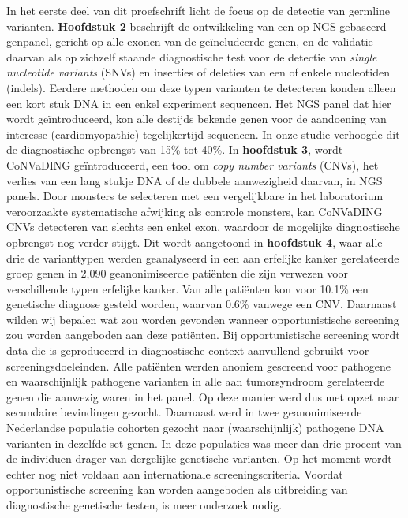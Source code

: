 \begin{appendices}
	In het eerste deel van dit proefschrift licht de focus op de detectie van germline varianten. \textbf{Hoofdstuk 2} beschrijft de ontwikkeling van een op NGS gebaseerd genpanel, gericht op alle exonen van de geïncludeerde genen, en de validatie daarvan als op zichzelf staande diagnostische test voor de detectie van \textsl{single nucleotide variants} (SNVs) en inserties of deleties van een of enkele nucleotiden (indels). Eerdere methoden om deze typen varianten te detecteren konden alleen een kort stuk DNA in een enkel experiment sequencen. Het NGS panel dat hier wordt geïntroduceerd, kon alle destijds bekende genen voor de aandoening van interesse (cardiomyopathie) tegelijkertijd sequencen. In onze studie verhoogde dit  de diagnostische opbrengst van 15\% tot 40\%. In \textbf{hoofdstuk 3}, wordt CoNVaDING geïntroduceerd, een tool om \textsl{copy number variants} (CNVs), het verlies van een lang stukje DNA of de dubbele aanwezigheid daarvan, in NGS panels. Door monsters te selecteren met een vergelijkbare in het laboratorium veroorzaakte systematische afwijking als controle monsters, kan CoNVaDING CNVs detecteren van slechts een enkel exon, waardoor de mogelijke diagnostische opbrengst nog verder stijgt. Dit wordt aangetoond in \textbf{hoofdstuk 4}, waar alle drie de varianttypen werden geanalyseerd in een aan erfelijke kanker gerelateerde groep genen in 2,090 geanonimiseerde patiënten die zijn verwezen voor verschillende typen erfelijke kanker. Van alle patiënten kon voor 10.1\% een genetische diagnose gesteld worden, waarvan 0.6\% vanwege een CNV. Daarnaast wilden wij bepalen wat zou worden gevonden wanneer opportunistische screening zou worden aangeboden aan deze patiënten. Bij opportunistische screening wordt data die is geproduceerd in diagnostische context aanvullend gebruikt voor screeningsdoeleinden. Alle patiënten werden anoniem gescreend voor pathogene en waarschijnlijk pathogene varianten in alle aan tumorsyndroom gerelateerde genen die aanwezig waren in het panel. Op deze manier werd dus met opzet naar secundaire bevindingen gezocht. Daarnaast werd in twee geanonimiseerde Nederlandse populatie cohorten gezocht naar (waarschijnlijk) pathogene DNA varianten in dezelfde set genen. In deze populaties was meer dan drie procent van de individuen drager van dergelijke genetische varianten. Op het moment wordt echter nog niet voldaan aan internationale screeningscriteria. Voordat opportunistische screening kan worden aangeboden als uitbreiding van diagnostische genetische testen, is meer onderzoek nodig.
	

\end{appendices}
